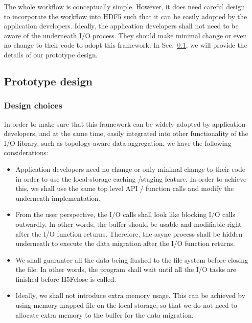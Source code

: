 \documentclass[aps, rmp, 11pt, notitlepage]{revtex4-1}
\begin{document}
The whole workflow is conceptually simple. However, it does need careful design to incorporate the workflow into HDF5 such that it can be easily adopted by the application developers.  Ideally, the application developers shall not need to be aware of the underneath I/O process. They should make minimal change or even no change to their code to adopt this framework. In Sec.~\ref{sec:design}, we will provide the details of our prototype design. 
\subsection{Prototype design}
\label{sec:design}
\subsubsection{Design choices}
In order to make sure that this framework can be widely adopted by application developers, and at the same time, easily integrated into other functionality of the I/O library, such as topology-aware data aggregation, we have the following considerations: 
\begin{itemize}
\item [(1)] Application developers need no change or only minimal change to their code in order to use the local-storage caching /staging feature. In order to achieve this, we shall use the same top level API / function calls and modify the underneath implementation. 
\item [(2)] From the user perspective, the I/O calls shall look like blocking I/O calls outwardly. In other words, the buffer should be usable and modifiable right after the I/O function returns. Therefore, the async process shall be hidden underneath to execute the data migration after the I/O function returns.  

\item [(3)] We shall guarantee all the data being flushed to the file system before closing the file. In other words, the program shall wait until all the I/O tasks are finished before H5Fclose is called. 

\item [(4)] Ideally, we shall not introduce extra memory usage. This can be achieved by using memory mapped file on the local storage, so that we do not need to allocate extra memory to the buffer for the data migration.
\end{itemize}
\end{document}
